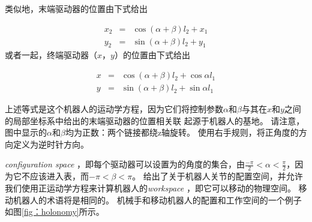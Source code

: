类似地，末端驱动器的位置由下式给出

\begin{eqnarray}
x_2&=&\cos(\alpha+\beta)l_2+x_1\\
y_2&=&\sin(\alpha+\beta)l_2+y_1
\end{eqnarray}
%
或者一起，终端驱动器$（x，y）$的位置由下式给出

\begin{eqnarray}\label{eq:cosx}
x&=&\cos(\alpha+\beta)l_2+\cos\alpha l_1\\
y&=&\sin(\alpha+\beta)l_2+\sin\alpha l_1
\end{eqnarray}


上述等式是这个机器人的运动学方程，因为它们将控制参数$ \alpha $和$ \beta $与其在$ x $和$ y $之间的局部坐标系中给出的末端驱动器的位置相关联 起源于机器人的基地。 请注意，图中显示的$ \alpha $和$ \beta $均为正数：两个链接都绕z轴旋转。 使用右手规则，将正角度的方向定义为逆时针方向。


\emph {configuration space}  ，即每个驱动器可以设置为的角度的集合，由$ \frac { - \pi} {2} <\alpha <\frac {\pi} {2} $，因为它不应该进入表，而$ - \pi <\beta <\pi $。 给出了关于机器人关节的配置空间，并允许我们使用正运动学方程来计算机器人的\emph {workspace} ，即它可以移动的物理空间。 移动机器人的术语将是相同的。 机械手和移动机器人的配置和工作空间的一个例子如图\ref {fig：holonomy}所示。

